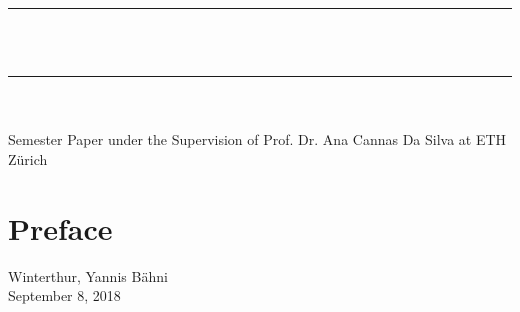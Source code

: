 



\frontmatter

\renewcommand*{\thefootnote}{\fnsymbol{footnote}}

\thispagestyle{empty}

\begin{center}
    \rule{\linewidth}{1mm}\\
	\\
	\rule{\linewidth}{1mm} \\[.5cm]
	\\
	\vspace{5cm}
	Semester Paper under the Supervision of Prof. Dr. Ana Cannas Da Silva at ETH Z\"urich
\end{center}
\clearpage

\chapter*{Preface}
\noindent Winterthur, \hfill Yannis B\"ahni\\
September 8, 2018
\tableofcontents

\mainmatter

\renewcommand*{\thefootnote}{\arabic{footnote}}




\appendix
\begin{appendix}

\end{appendix}

\printbibliography


